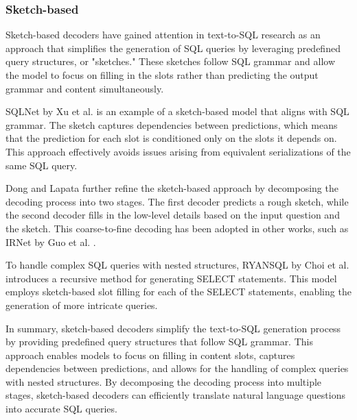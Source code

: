 \subsubsection{Sketch-based}

Sketch-based decoders have gained attention in text-to-SQL research as an approach that simplifies the generation of SQL queries by leveraging predefined query structures, or "sketches." These sketches follow SQL grammar and allow the model to focus on filling in the slots rather than predicting the output grammar and content simultaneously.

SQLNet by Xu et al.  \cite{xu_sqlnet_2017} is an example of a sketch-based model that aligns with SQL grammar. The sketch captures dependencies between predictions, which means that the prediction for each slot is conditioned only on the slots it depends on. This approach effectively avoids issues arising from equivalent serializations of the same SQL query.

Dong and Lapata  \cite{dong-lapata-2018-coarse} further refine the sketch-based approach by decomposing the decoding process into two stages. The first decoder predicts a rough sketch, while the second decoder fills in the low-level details based on the input question and the sketch. This coarse-to-fine decoding has been adopted in other works, such as IRNet by Guo et al.  \cite{DBLP:journals/corr/abs-1905-08205}.

To handle complex SQL queries with nested structures, RYANSQL by Choi et al.  \cite{10.1162/coli_a_00403} introduces a recursive method for generating SELECT statements. This model employs sketch-based slot filling for each of the SELECT statements, enabling the generation of more intricate queries.

In summary, sketch-based decoders simplify the text-to-SQL generation process by providing predefined query structures that follow SQL grammar. This approach enables models to focus on filling in content slots, captures dependencies between predictions, and allows for the handling of complex queries with nested structures. By decomposing the decoding process into multiple stages, sketch-based decoders can efficiently translate natural language questions into accurate SQL queries.